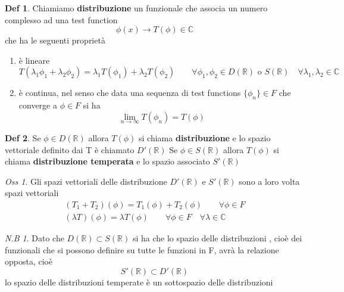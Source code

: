 \documentclass[a4paper,11pt]{report}
\theoremstyle{remark}
\newtheorem*{oss}{Oss}
\newtheorem*{nb}{N.B}
\theoremstyle{definition}
\newtheorem*{Def}{Def}
\newcommand{\C}{\mathbb{C}}
\newcommand{\R}{\mathbb{R}}
\begin{document}
\begin{Def}
	Chiamiamo \textbf{distribuzione} un funzionale che associa un numero complesso ad una test function
	\begin{equation*}
		\phi(x) \to T(\phi) \in \C
	\end{equation*}
	che ha le seguenti proprietà
	\begin{enumerate}
		\item è lineare
		\begin{equation*}
			T(\lambda_1\phi_1 + \lambda_2\phi_2) = \lambda_1T(\phi_1)+ \lambda_2T(\phi_2) \qquad \forall\phi_1,\phi_2 \in D(\R)\text{ o } S(\R) \quad \forall \lambda_1,\lambda_2 \in \C 
		\end{equation*}
		\item è continua, nel senso che data una sequenza di test functions $\{\phi_n\}\in F$ che converge a $\phi\in F$ si ha
		\begin{equation*}
			\lim_{n\to\infty} T(\phi_n) = T(\phi)
		\end{equation*}
	\end{enumerate}
\end{Def}

\begin{Def}
	Se $\phi\in D(\R)$ allora $T(\phi)$ si chiama \textbf{distribuzione} e lo spazio vettoriale definito dai T è chiamato $D'(\R)$ \newline
	Se $\phi\in S(\R)$ allora $T(\phi)$ si chiama \textbf{distribuzione temperata} e lo spazio associato $S'(\R)$
\end{Def}

\begin{oss}
	Gli spazi vettoriali delle distribuzione $D'(\R)$ e $S'(\R)$ sono a loro volta spazi vettoriali
	\begin{gather*}
		(T_1+T_2)(\phi) = T_1(\phi) + T_2(\phi) \qquad \forall \phi\in F \\
		(\lambda T)(\phi) = \lambda T(\phi) \qquad \forall\phi \in F \quad \forall \lambda \in \C 
	\end{gather*}
\end{oss}

\begin{nb}
	Dato che $D(\R)\subset S(\R)$ si ha che lo spazio delle distribuzioni , cioè dei funzionali che si possono definire su tutte le funzioni in F, avrà la relazione opposta, cioè
	\begin{equation*}
		S'(\R) \subset D'(\R)
	\end{equation*}
	lo spazio delle distribuzioni temperate è un sottospazio delle distribuzioni
\end{nb}
\end{document}

